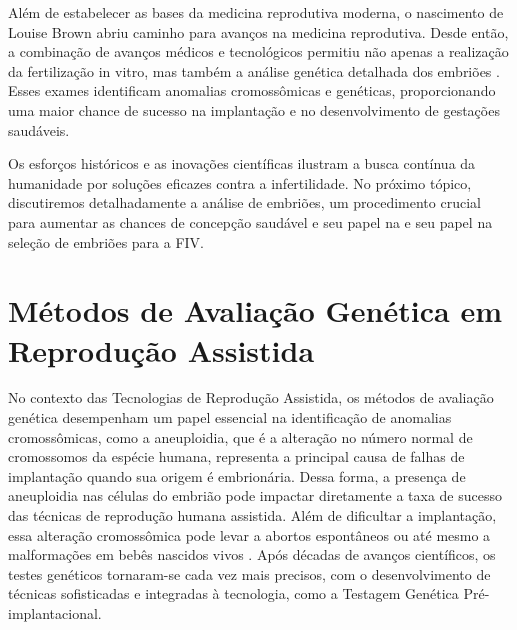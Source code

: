 Além de estabelecer as bases da medicina reprodutiva moderna, o nascimento de Louise Brown abriu caminho para avanços na medicina reprodutiva. Desde então, a combinação de avanços médicos e tecnológicos permitiu não apenas a realização da fertilização in vitro, mas também a análise genética detalhada dos embriões \cite{moura2020}. Esses exames identificam anomalias cromossômicas e genéticas, proporcionando uma maior chance de sucesso na implantação e no desenvolvimento de gestações saudáveis.

Os esforços históricos e as inovações científicas ilustram a busca contínua da humanidade por soluções eficazes contra a infertilidade. No próximo tópico, discutiremos detalhadamente a análise de embriões, um procedimento crucial para aumentar as chances de concepção saudável e seu papel na e seu papel na seleção de embriões para a FIV.

\section{Métodos de Avaliação Genética em Reprodução Assistida}

No contexto das Tecnologias de Reprodução Assistida, os métodos de avaliação genética desempenham um papel essencial na identificação de anomalias cromossômicas, como a aneuploidia, que é a alteração no número normal de cromossomos da espécie humana, representa a principal causa de falhas de implantação quando sua origem é embrionária. Dessa forma, a presença de aneuploidia nas células do embrião pode impactar diretamente a taxa de sucesso das técnicas de reprodução humana assistida. Além de dificultar a implantação, essa alteração cromossômica pode levar a abortos espontâneos ou até mesmo a malformações em bebês nascidos vivos \cite{milanezi2022}. Após décadas de avanços científicos, os testes genéticos tornaram-se cada vez mais precisos, com o desenvolvimento de técnicas sofisticadas e integradas à tecnologia, como a Testagem Genética Pré-implantacional.

